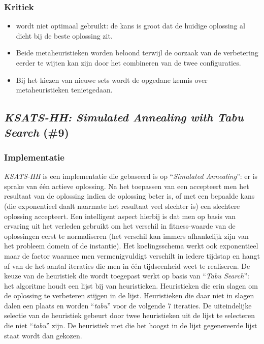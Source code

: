 \subsubsection{Kritiek}
\begin{itemize}
 \item \abco[C]{} wordt niet optimaal gebruikt: de kans is groot dat de huidige oplossing al dicht bij de beste oplossing zit.
 \item Beide metaheuristieken worden beloond terwijl de oorzaak van de verbetering eerder te wijten kan zijn door het combineren van de twee configuraties.
 \item Bij het kiezen van nieuwe sets wordt de opgedane kennis over metaheuristieken tenietgedaan.
\end{itemize}
\subsection{\emph{KSATS-HH: Simulated Annealing with Tabu Search} (\#9)}
\label{sss:ksats-hh}
\subsubsection{Implementatie}
\emph{KSATS-HH}\cite{chesc-ksats-hh} is een implementatie die gebaseerd is op ``\emph{Simulated Annealing}''\cite{citeulike:1612433}: er is sprake van \'e\'en actieve oplossing. Na het toepassen van een \abllh{} accepteert men het resultaat van de oplossing indien de oplossing beter is, of met een bepaalde kans (die exponentieel daalt naarmate het resultaat veel slechter is) een slechtere oplossing accepteert. Een intelligent aspect hierbij is dat men op basis van ervaring uit het verleden gebruikt om het verschil in fitness-waarde van de oplossingen eerst te normaliseren (het verschil kan immers afhankelijk zijn van het probleem domein of de instantie). Het koelingsschema werkt ook exponentieel maar de factor waarmee men vermenigvuldigt verschilt in iedere tijdstap en hangt af van de het aantal iteraties die men in \'e\'en tijdseenheid weet te realiseren. De keuze van de heuristiek die wordt toegepast werkt op basis van ``\emph{Tabu Search}''\cite{DBLP:journals/informs/Glover89}: het algoritme houdt een lijst bij van heuristieken. Heuristieken die erin slagen om de oplossing te verbeteren stijgen in de lijst. Heuristieken die daar niet in slagen dalen een plaats en worden ``\emph{tabu}'' voor de volgende 7 iteraties. De uiteindelijke selectie van de heuristiek gebeurt door twee heuristieken uit de lijst te selecteren die niet ``\emph{tabu}'' zijn. De heuristiek met die het hoogst in de lijst gegenereerde lijst staat wordt dan gekozen.
